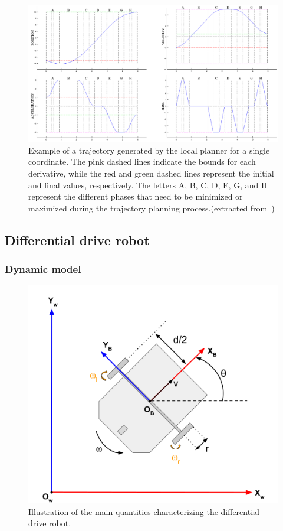 \begin{figure} [t]
  \centering
  \includegraphics[width=0.99\linewidth]{figures/models/kino.png} 
  \caption{Example of a trajectory generated by the local planner for a single coordinate. The pink dashed lines indicate the bounds for each derivative, while the red and green dashed lines represent the initial and final values, respectively. 
  The letters A, B, C, D, E, G, and H represent the different phases that need to be minimized or maximized during the trajectory planning process.(extracted from~\cite{cKino})}%
  \label{fig:kino}%
\end{figure}

\subsection{Differential drive robot}

\subsubsection{Dynamic model}

\begin{figure} [t]
  \centering
  \includegraphics[width=0.6\linewidth]{figures/models/unicycle.png} 
  \caption{Illustration of the main quantities characterizing the differential drive robot.}%
  \label{fig:unicycle}%
\end{figure}

